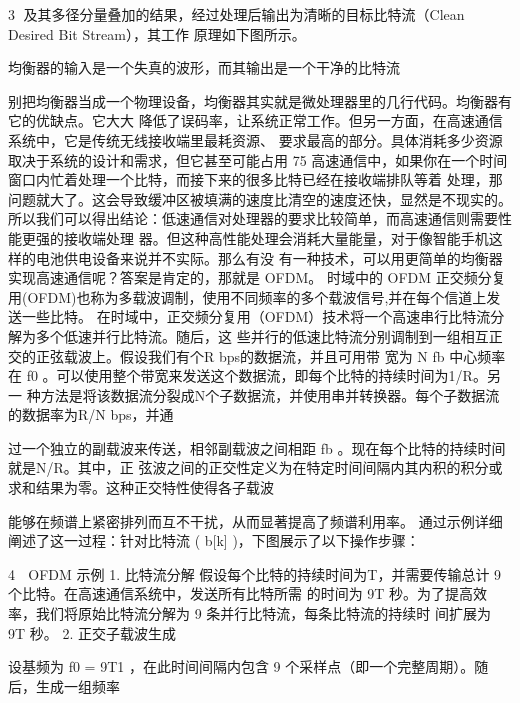                                                        3
及其多径分量叠加的结果，经过处理后输出为清晰的目标比特流（Clean Desired Bit Stream），其工作
原理如下图所示。




           均衡器的输入是一个失真的波形，而其输出是一个干净的比特流

别把均衡器当成一个物理设备，均衡器其实就是微处理器里的几行代码。均衡器有它的优缺点。它大大
降低了误码率，让系统正常工作。但另一方面，在高速通信系统中，它是传统无线接收端里最耗资源、
要求最高的部分。具体消耗多少资源取决于系统的设计和需求，但它甚至可能占用 75%
高速通信中，如果你在一个时间窗口内忙着处理一个比特，而接下来的很多比特已经在接收端排队等着
处理，那问题就大了。这会导致缓冲区被填满的速度比清空的速度还快，显然是不现实的。
所以我们可以得出结论：低速通信对处理器的要求比较简单，而高速通信则需要性能更强的接收端处理
器。但这种高性能处理会消耗大量能量，对于像智能手机这样的电池供电设备来说并不实际。那么有没
有一种技术，可以用更简单的均衡器实现高速通信呢？答案是肯定的，那就是 OFDM。
时域中的 OFDM
正交频分复用(OFDM)也称为多载波调制，使用不同频率的多个载波信号,并在每个信道上发送一些比特。
在时域中，正交频分复用（OFDM）技术将一个高速串行比特流分解为多个低速并行比特流。随后，这
些并行的低速比特流分别调制到一组相互正交的正弦载波上。假设我们有个R bps的数据流，并且可用带
宽为 N fb 中心频率在 f0 。可以使用整个带宽来发送这个数据流，即每个比特的持续时间为1/R。另一
种方法是将该数据流分裂成N个子数据流，并使用串并转换器。每个子数据流的数据率为R/N bps，并通
     ​        ​




过一个独立的副载波来传送，相邻副载波之间相距 fb 。现在每个比特的持续时间就是N/R。其中，正
弦波之间的正交性定义为在特定时间间隔内其内积的积分或求和结果为零。这种正交特性使得各子载波
                             ​




能够在频谱上紧密排列而互不干扰，从而显著提高了频谱利用率。
通过示例详细阐述了这一过程：针对比特流 ( b[k] )，下图展示了以下操作步骤：



                                                         4
                                OFDM 示例
1. 比特流分解
   假设每个比特的持续时间为T，并需要传输总计 9 个比特。在高速通信系统中，发送所有比特所需
   的时间为 9T 秒。为了提高效率，我们将原始比特流分解为 9 条并行比特流，每条比特流的持续时
   间扩展为 9T 秒。
2. 正交子载波生成

   设基频为 f0 = 9T1 ，在此时间间隔内包含 9 个采样点（即一个完整周期）。随后，生成一组频率
            ​       ​




